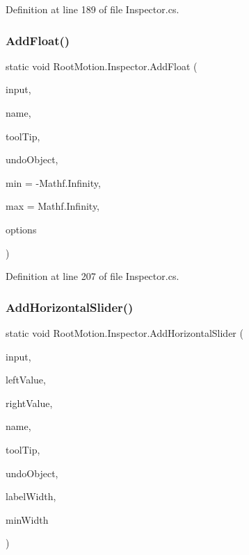 Definition at line 189 of file Inspector.\+cs.

\mbox{\label{class_root_motion_1_1_inspector_a700893d4651ca702d745bbc97c253a45}} 
\subsubsection{\texorpdfstring{Add\+Float()}{AddFloat()}}
{\footnotesize\ttfamily static void Root\+Motion.\+Inspector.\+Add\+Float (\begin{DoxyParamCaption}\item[{ref float}]{input,  }\item[{string}]{name,  }\item[{string}]{tool\+Tip,  }\item[{\mbox{\hyperlink{_quads_8cs_aef19bab18b9814edeef255c43e4f6bbc}{Object}}}]{undo\+Object,  }\item[{float}]{min = {\ttfamily -\/Mathf.Infinity},  }\item[{float}]{max = {\ttfamily Mathf.Infinity},  }\item[{params G\+U\+I\+Layout\+Option \mbox{[}$\,$\mbox{]}}]{options }\end{DoxyParamCaption})\hspace{0.3cm}{\ttfamily [static]}}



Definition at line 207 of file Inspector.\+cs.

\mbox{\label{class_root_motion_1_1_inspector_ae97e87201fcfa1ef382b9f00e2c6cfce}} 
\subsubsection{\texorpdfstring{Add\+Horizontal\+Slider()}{AddHorizontalSlider()}}
{\footnotesize\ttfamily static void Root\+Motion.\+Inspector.\+Add\+Horizontal\+Slider (\begin{DoxyParamCaption}\item[{ref float}]{input,  }\item[{float}]{left\+Value,  }\item[{float}]{right\+Value,  }\item[{string}]{name,  }\item[{string}]{tool\+Tip,  }\item[{\mbox{\hyperlink{_quads_8cs_aef19bab18b9814edeef255c43e4f6bbc}{Object}}}]{undo\+Object,  }\item[{int}]{label\+Width,  }\item[{int}]{min\+Width }\end{DoxyParamCaption})\hspace{0.3cm}{\ttfamily [static]}}



